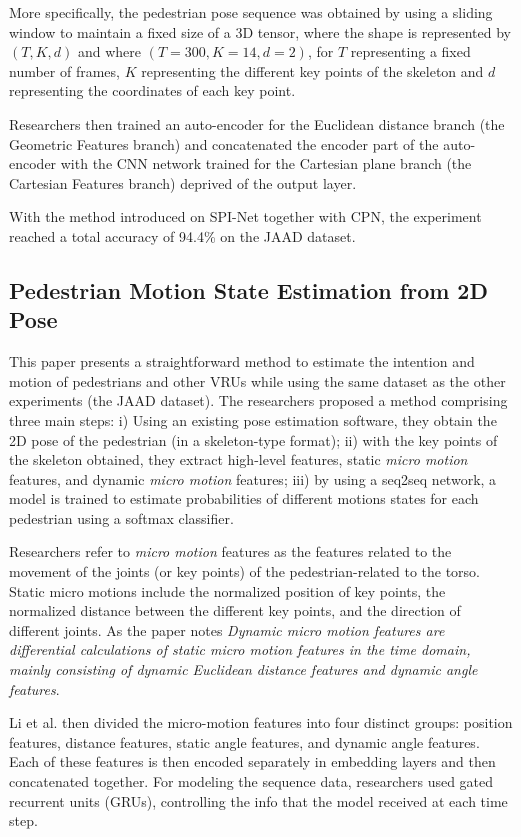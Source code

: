 \documentclass[conference, onecolumn]{IEEEtran}
\begin{document}
More specifically, the pedestrian pose sequence was obtained by using a sliding window to maintain a fixed size of a 3D tensor, where the shape is represented by $(T, K, d)$ and where $(T = 300, K = 14, d=2)$, for $T$ representing a fixed number of frames, $K$ representing the different key points of the skeleton and $d$ representing the coordinates of each key point.

Researchers then trained an auto-encoder for the Euclidean distance branch (the Geometric Features branch) and concatenated the encoder part of the auto-encoder with the CNN network trained for the Cartesian plane branch (the Cartesian Features branch) deprived of the output layer.

With the method introduced on SPI-Net together with CPN, the experiment reached a total accuracy of 94.4\% on the JAAD dataset.

\subsection{Pedestrian Motion State Estimation from 2D Pose}

This paper presents a straightforward method to estimate the intention and motion of pedestrians and other VRUs while using the same dataset as the other experiments (the JAAD dataset). The researchers proposed a method comprising three main steps: i) Using an existing pose estimation software, they obtain the 2D pose of the pedestrian (in a skeleton-type format); ii) with the key points of the skeleton obtained, they extract high-level features, static \emph{micro motion} features, and dynamic \emph{micro motion} features; iii) by using a seq2seq network, a model is trained to estimate probabilities of different motions states for each pedestrian using a softmax classifier.

Researchers refer to \emph{micro motion} features as the features related to the movement of the joints (or key points) of the pedestrian-related to the torso. Static micro motions include the normalized position of key points, the normalized distance between the different key points, and the direction of different joints. As the paper notes \emph{Dynamic micro motion features are differential calculations of static micro motion features in the time domain, mainly consisting of dynamic Euclidean distance features and dynamic angle features}.

Li et al. then divided the micro-motion features into four distinct groups: position features, distance features, static angle features, and dynamic angle features. Each of these features is then encoded separately in embedding layers and then concatenated together. For modeling the sequence data, researchers used gated recurrent units (GRUs), controlling the info that the model received at each time step.
\end{document}
